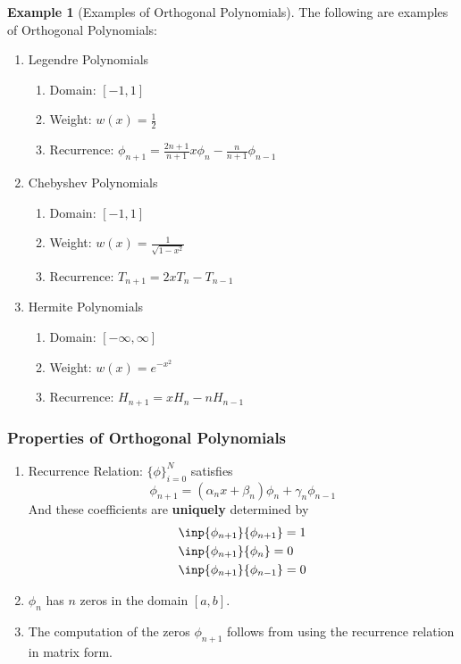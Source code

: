 \documentclass[12pt]{article}
\theoremstyle{definition}
\newtheorem{example}{\color{WildStrawberry}Example}
\theoremstyle{definition}
\begin{document}
\begin{example}[Examples of Orthogonal Polynomials]
The following are examples of Orthogonal Polynomials:
\begin{enumerate}
	\item Legendre Polynomials
	\begin{enumerate}
		\item Domain: $[-1,1]$
		\item Weight: $w(x) = \frac{1}{2}$
		\item Recurrence: $\phi_{n+1} = \frac{2n+1}{n+1}x\phi_n - \frac{n}{n+1}\phi_{n-1}$
	\end{enumerate}
	\item Chebyshev Polynomials
	\begin{enumerate}
		\item Domain: $[-1,1]$
		\item Weight: $w(x) = \frac{1}{\sqrt{1-x^2}}$
		\item Recurrence: $T_{n+1} = 2x T_n - T_{n-1}$
	\end{enumerate}
	\item Hermite Polynomials
	\begin{enumerate}
		\item Domain: $[-\infty,\infty]$
		\item Weight: $w(x) = e^{-x^2}$
		\item Recurrence: $H_{n+1} = xH_n - nH_{n-1}$
	\end{enumerate}
\end{enumerate}
\end{example}

\subsubsection{Properties of Orthogonal Polynomials}
\begin{enumerate}
	\item Recurrence Relation: $\{\phi\}_{i=0}^N$ satisfies
	\begin{equation}
		\phi_{n+1} = (\alpha_n x + \beta_n)\phi_n + \gamma_n \phi_{n-1}
	\end{equation}
	And these coefficients are \textbf{uniquely} determined by 
	\begin{align*}
		&\inp{\phi_{n+1}}{\phi_{n+1}} = 1 \\
		&\inp{\phi_{n+1}}{\phi_{n}} = 0 \\
		&\inp{\phi_{n+1}}{\phi_{n-1}} = 0
	\end{align*}
	\item $\phi_n$ has $n$ zeros in the domain $[a,b]$.
	\item The computation of the zeros $\phi_{n+1}$ follows from using the recurrence relation in matrix form. 
\end{enumerate}
\end{document}
